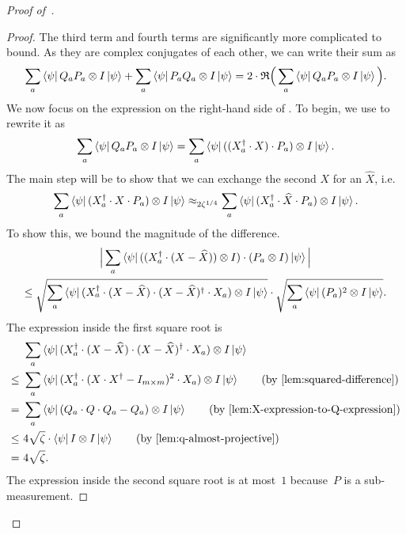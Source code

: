 \begin{proof}[Proof of~]
\begin{proof}
The third term and fourth terms are significantly more complicated to bound.
As they are complex conjugates of each other, we can write their sum as
\begin{equation}\label{eq:complex-conjugates}
\sum_a \bra{\psi} Q_a P_a \otimes I \ket{\psi}
	+ \sum_a \bra{\psi} P_a Q_a \otimes I \ket{\psi}
= 2 \cdot \mathfrak{R}\Big(\sum_a \bra{\psi} Q_a P_a \otimes I \ket{\psi}\Big).
\end{equation}
We now focus on the expression on the right-hand side of .
To begin, we use  to rewrite it as
\begin{equation*}
\sum_a \bra{\psi} Q_a P_a \otimes I \ket{\psi}
= \sum_a \bra{\psi} ((X_a^\dagger \cdot X) \cdot P_a)  \otimes I \ket{\psi}.
\end{equation*}
The main step will be to show that we can exchange the second $X$ for an $\widehat{X}$, i.e.
\begin{equation}\label{eq:add-a-hat}
\sum_a \bra{\psi} (X_a^\dagger \cdot X \cdot P_a) \otimes I \ket{\psi}
\approx_{2\zeta^{1/4}} \sum_a \bra{\psi} (X_a^\dagger \cdot \widehat{X} \cdot P_a)  \otimes I \ket{\psi}.
\end{equation}
To show this, we bound the magnitude of the difference.
\begin{multline*}
\Big|\sum_a \bra{\psi} ((X_a^\dagger \cdot (X - \widehat{X})) \otimes I) \cdot(P_a \otimes I) \ket{\psi}\Big|\\
\leq \sqrt{\sum_a \bra{\psi}(X_a^\dagger \cdot (X - \widehat{X})  \cdot (X - \widehat{X})^\dagger \cdot X_a) \otimes I \ket{\psi}}\cdot \sqrt{\sum_a \bra{\psi} (P_a)^2 \otimes I \ket{\psi}}.
\end{multline*}
The expression inside the first square root is
\begin{align*}
& \sum_a \bra{\psi}(X_a^\dagger \cdot (X - \widehat{X})  \cdot (X - \widehat{X})^\dagger \cdot X_a) \ot I \ket{\psi}\\
\leq~&  \sum_a \bra{\psi} (X_a^\dagger \cdot (X \cdot X^\dagger - I_{m \times m})^2 \cdot X_a) \ot I \ket{\psi}\tag{by \Cref{lem:squared-difference}}\\
=~&  \sum_a \bra{\psi} (Q_a \cdot Q \cdot Q_a - Q_a)  \ot I \ket{\psi}\tag{by \Cref{lem:X-expression-to-Q-expression}}\\
\leq~& 4\sqrt{\zeta} \cdot \bra{\psi} I \ot I \ket{\psi} \tag{by~\Cref{lem:q-almost-projective}}\\
=~& 4\sqrt{\zeta}.
\end{align*}
The expression inside the second square root is at most~$1$ because~$P$ is a sub-measurement.

\end{proof}
\end{proof}
